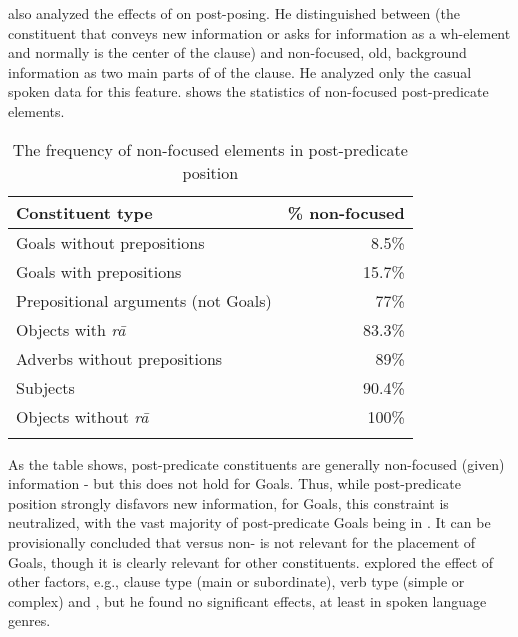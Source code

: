 \documentclass[output=paper,colorlinks,citecolor=brown,draftmode]{langscibook}
\begin{document}
\citet[135]{frommer_post-verbal_1981} also analyzed the effects of  on post-posing. He distinguished between  (the constituent that conveys new information or asks for information as a wh-element and normally is the  center of the clause) and non-focused, old, background information as two main parts of  of the clause. He analyzed only the casual spoken data for this feature.  shows the statistics of non-focused post-predicate elements.

\begin{table}
 \begin{tabularx}{.8\textwidth}{Xr}
\lsptoprule
Constituent type & \% non-focused \\
\midrule
Goals without prepositions & 8.5\% \\
Goals with prepositions & 15.7\% \\
\midrule
Prepositional arguments (not Goals) & 77\% \\
Objects with \textit{rā} & 83.3\% \\
Adverbs without prepositions & 89\% \\
Subjects & 90.4\% \\
Objects without \textit{rā} & 100\% \\
\lspbottomrule
 \end{tabularx}
 \caption{The frequency of non-focused elements in post-predicate position \citep[137]{frommer_post-verbal_1981}}
 \label{Persian:tab:5}
\end{table}

\begin{sloppypar}
As the table shows, post-predicate constituents are generally non-focused (given) information - but this does not hold for Goals. Thus, while post-predicate position strongly disfavors new information, for Goals, this constraint is neutralized, with the vast majority of post-predicate Goals being in . It can be provisionally concluded that  versus non- is not relevant for the placement of Goals, though it is clearly relevant for other constituents. \citet{frommer_post-verbal_1981} explored the effect of other factors, e.g., clause type (main or subordinate), verb type (simple or complex) and , but he found no significant effects, at least in spoken language genres. 
\end{sloppypar}
\end{document}
